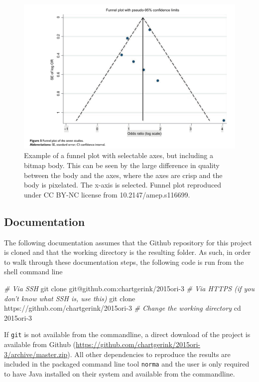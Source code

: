 \documentclass[a5paper]{book}
\newenvironment{Shaded}{\begin{snugshade}}{\end{snugshade}}
\newcommand{\CommentTok}[1]{\textcolor[rgb]{0.56,0.35,0.01}{\textit{#1}}}
\newcommand{\FunctionTok}[1]{\textcolor[rgb]{0.00,0.00,0.00}{#1}}
\newcommand{\BuiltInTok}[1]{#1}
\newcommand{\NormalTok}[1]{#1}
\begin{document}
\begin{figure}[h]
\includegraphics[width=1\linewidth]{assets/figures/example-bitmap} \caption{Example of a funnel plot with selectable axes, but including a bitmap body. This can be seen by the large difference in quality between the body and the axes, where the axes are crisp and the body is pixelated. The x-axis is selected. Funnel plot reproduced under CC BY-NC license from 10.2147/amep.s116699.}\label{fig:vector-fig3}
\end{figure}

\subsection{Documentation}\label{documentation}

The following documentation assumes that the Github repository for this
project is cloned and that the working directory is the resulting
folder. As such, in order to walk through these documentation steps, the
following code is run from the shell command line

\begin{Shaded}
\begin{Highlighting}[]
\CommentTok{# Via SSH}
\FunctionTok{git}\NormalTok{ clone git@github.com:chartgerink/2015ori-3}
\CommentTok{# Via HTTPS (if you don't know what SSH is, use this)}
\FunctionTok{git}\NormalTok{ clone https://github.com/chartgerink/2015ori-3}
\CommentTok{# Change the working directory}
\BuiltInTok{cd}\NormalTok{ 2015ori-3}
\end{Highlighting}
\end{Shaded}

If \texttt{git} is not available from the commandline, a direct download
of the project is available from Github
(\url{https://github.com/chartgerink/2015ori-3/archive/master.zip}). All
other dependencies to reproduce the results are included in the packaged
command line tool \texttt{norma} and the user is only required to have
Java installed on their system and available from the commandline.
\end{document}
